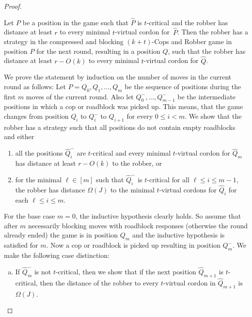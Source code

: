 \documentclass[a4paper,english, thm-restate]{lipics-v2021}
\begin{document}
\begin{proof}
	\begin{claim}
		\label{clm:only-constant-rows-per-round}
		Let $P$ be a position in the game such that $\hat{P}$ is $t$-critical
		and the robber 
		has distance at least $r$ to every 
		minimal $t$-virtual cordon for~$\hat{P}$.
		Then the robber has a strategy in the compressed and blocking $(k+t)$-Cops and Robber game in position $P$
		for the next round, resulting in a position $Q$,
		such that the robber has distance at least $r-O(k)$ to every minimal $t$-virtual cordon for $\hat{Q}$.
	\end{claim}
	\begin{claimproof}
		We prove the statement by induction on the number of moves in the current round as follows:
		Let $P=Q_0, Q_1, \dots ,Q_m$ be the sequence of positions during the first $m$ moves of the current round.
		Also let $Q_0^-, \dots, Q_{m-1}^-$ be the intermediate positions in which a cop or roadblock was picked up.
		This means, that the game changes from position $Q_i$ to $Q_i^-$ to $Q_{i+1}$ for every $0 \leq i < m$.
		We show that the robber has a strategy such that all positions do not contain empty roadblocks and either
		\begin{enumerate}
			\item all the positions $\hat{Q}_i^-$ are $t$-critical and
			every minimal $t$-virtual cordon for $\hat{Q}_m$ has distance at least $r-O(k)$ to the robber, or
			\item for the minimal $\ell \in [m]$ such that $\hat{Q}_i^-$
			is $t$-critical for all $\ell\leq i \leq m-1$, the robber has distance $\Omega(J)$ to
			the minimal $t$-virtual cordons for $\hat{Q}_i$
			for each $\ell\leq i \leq m$.
		\end{enumerate}
		For the base case $m=0$,
		the inductive hypothesis clearly holds.
		So assume that after $m$ necessarily blocking moves with roadblock responses (otherwise the round already ended)
		the game is in position $Q_m$
		and the inductive hypothesis is satisfied for $m$.
		Now a cop or roadblock is picked up resulting in
		position $Q_m^-$.
		We make the following case distinction:
		\begin{enumerate}[(a)]
			\item If $\hat{Q}_m^-$ is not $t$-critical,
			then we show that if the next position $\hat{Q}_{m+1}$
			 is $t$-critical, then
			the distance of the robber to every $t$-virtual cordon in $\hat{Q}_{m+1}$ is $\Omega(J)$. 
			

\end{enumerate}
\end{claimproof}
\end{proof}
\end{document}
